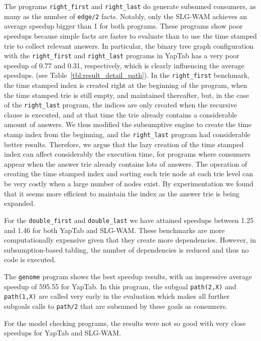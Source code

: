 The programs \texttt{right\_first} and \texttt{right\_last} do generate subsumed consumers,
as many as the number of \texttt{edge/2} facts. Notably, only the SLG-WAM
achieves an average speedup bigger than 1 for both programs. These programs show poor speedups because simple facts
are faster to evaluate than to use the time stamped trie to collect relevant answers.
In particular, the binary tree graph configuration with the \texttt{right\_first} and \texttt{right\_last} programs
in YapTab has a very poor speedup of 0.77 and 0.31, respectively, which is clearly influencing the average speedups.
(see Table~\ref{tbl:result_detail_path}).
In the \texttt{right\_first} benchmark, the time stamped index is created right at
the beginning of the program, when the time stamped trie is still empty, and maintained thereafter, but,
in the case of the \texttt{right\_last} program, the indices are only created when the recursive
clause is executed, and at that time the trie already contains a considerable amount of answers.
We thus modified the subsumptive
engine to create the time stamp index from the beginning, and the \texttt{right\_last} program had considerable
better results. Therefore, we argue that the lazy creation of the time stamped index can affect considerably the
execution time, for programs where consumers appear when the answer trie already contains lots of answers.
The operation of creating the time stamped index
and sorting each trie node at each trie level can be very costly when a large number of nodes exist.
By experimentation we found that it seems more efficient to maintain the index as the answer trie is being expanded.

For the \texttt{double\_first} and \texttt{double\_last} we have attained speedups between 1.25 and 1.46
for both YapTab and SLG-WAM. These benchmarks are more computationally expensive given that they create more
dependencies. However, in subsumption-based tabling, the number of dependencies is reduced 
and thus no code is executed.

The \texttt{genome} program shows the best speedup results, with an impressive average speedup of 
595.55 for YapTab. In this program, the subgoal \texttt{path(2,X)} and \texttt{path(1,X)} are called
very early in the evaluation which makes all further subgoals calls to \texttt{path/2} that are subsumed by these
goals as consumers.

For the model checking programs, the results were not so good with very close speedups for YapTab and SLG-WAM.

